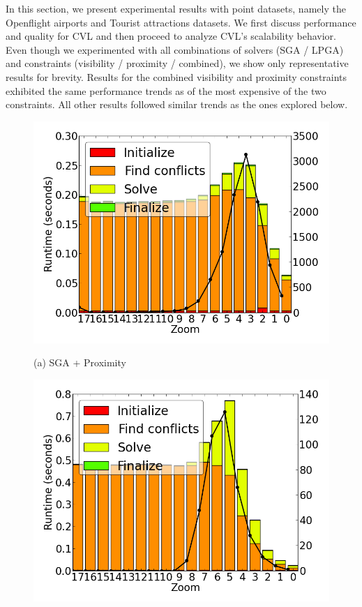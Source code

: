 In this section, we present experimental results with point datasets, namely the Openflight airports and Tourist attractions datasets. We first discuss performance and quality for CVL and then proceed to analyze CVL's scalability behavior. Even though we experimented with all combinations of solvers (SGA / LPGA) and constraints (visibility / proximity / combined), we show only representative results for brevity. Results for the combined visibility and proximity constraints exhibited the same performance trends as of the most expensive of the two constraints. All other results followed similar trends as the ones explored below.

\begin{figure}[tb]
  \begin{minipage}{0.329\linewidth}
    \centerline{\includegraphics[width=0.9\linewidth]{./figs/prelim_pnt_7k_airports_heuristic_B.png}}
    \centerline{(a) SGA + Proximity}
  \end{minipage} \hfill
  \begin{minipage}{0.329\linewidth}
    \centerline{\includegraphics[width=0.9\linewidth]{./figs/prelim_pnt_7k_airports_lp_A.png}}

\end{minipage}
\end{figure}
